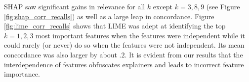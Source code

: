\documentclass[12pt]{article}  %
\begin{document}
 SHAP saw significant gains in relevance for all $k$ except $k=3,8,9$ (see  Figure \ref{fig:shap_corr_recalls}) as well as a large leap in concordance. Figure \ref{fig:lime_corr_recalls} shows that LIME was adept at identifying the top $k=1,2,3$ most important features when the features were independent while it could rarely (or never) do so when the features were not independent. Its mean concordance was also larger by about $.2$. It is evident from our results that the interdependence of features obfuscates explainers and leads to incorrect feature importance.    

        
\end{document}
